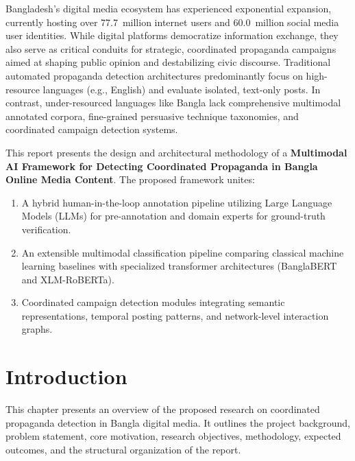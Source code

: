 \documentclass[12pt,a4paper]{report}
\begin{document}
Bangladesh's digital media ecosystem has experienced exponential expansion,
currently hosting over 77.7~million internet users and 60.0~million social media
user identities. While digital platforms democratize information exchange, they
also serve as critical conduits for strategic, coordinated propaganda campaigns
aimed at shaping public opinion and destabilizing civic discourse. Traditional
automated propaganda detection architectures predominantly focus on high-resource
languages (e.g., English) and evaluate isolated, text-only posts. In contrast,
under-resourced languages like Bangla lack comprehensive multimodal annotated
corpora, fine-grained persuasive technique taxonomies, and coordinated campaign
detection systems.

This report presents the design and architectural methodology of a
\textbf{Multimodal AI Framework for Detecting Coordinated Propaganda in Bangla
Online Media Content}. The proposed framework unites:
\begin{enumerate}
  \item A hybrid human-in-the-loop annotation pipeline utilizing Large Language
        Models (LLMs) for pre-annotation and domain experts for ground-truth
        verification.
  \item An extensible multimodal classification pipeline comparing classical
        machine learning baselines with specialized transformer architectures
        (BanglaBERT and XLM-RoBERTa).
  \item Coordinated campaign detection modules integrating semantic
        representations, temporal posting patterns, and network-level interaction
        graphs.
\end{enumerate}

\clearpage
\tableofcontents
\clearpage
\listoffigures
\clearpage
\listoftables
\clearpage
{}

\chapter{Introduction}
\label{ch:intro}

This chapter presents an overview of the proposed research on coordinated
propaganda detection in Bangla digital media. It outlines the project background,
problem statement, core motivation, research objectives, methodology, expected
outcomes, and the structural organization of the report.
\end{document}

